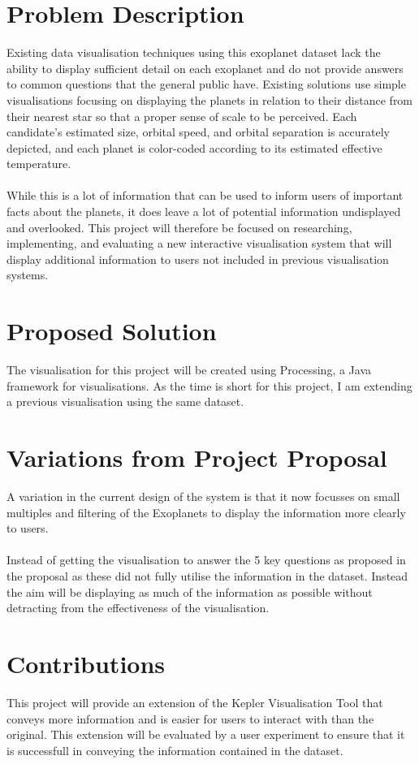 \documentclass[11pt
              , a4paper
              , twoside
              , openright
              ]{report}
\begin{document}
\section{Problem Description}
Existing data visualisation techniques using this exoplanet dataset lack the ability to display
sufficient detail on each exoplanet and do not provide answers to common questions that
the general public have. Existing solutions use simple visualisations focusing on displaying
the planets in relation to their distance from their nearest star so that a proper sense of
scale to be perceived. Each candidate’s estimated size, orbital speed, and orbital separation
is accurately depicted, and each planet is color-coded according to its estimated effective
temperature.
\\\\
While this is a lot of information that can be used to inform users of important facts about
the planets, it does leave a lot of potential information undisplayed and overlooked.
This project will therefore be focused on researching, implementing, and evaluating a new
interactive visualisation system that will display additional information to users not included
in previous visualisation systems.
\section{Proposed Solution}
The visualisation for this project will be created using Processing, a Java framework for visualisations. As the time is short for this project, I am extending a previous visualisation using the same dataset. 
\section{Variations from Project Proposal}
A variation in the current design of the system is that it now focusses on small multiples and filtering of the Exoplanets to display the information more clearly to users.
\\\\
Instead of getting the visualisation to answer the 5 key questions as proposed in the proposal as these did not fully utilise the information in the dataset. Instead the aim will be displaying as much of the information as possible without detracting from the effectiveness of the visualisation.
\section{Contributions}
This project will provide an extension of the Kepler Visualisation Tool \cite{kepler} that conveys more information and is easier for users to interact with than the original. This extension will be evaluated by a user experiment to ensure that it is successfull in conveying the information contained in the dataset.
\end{document}

